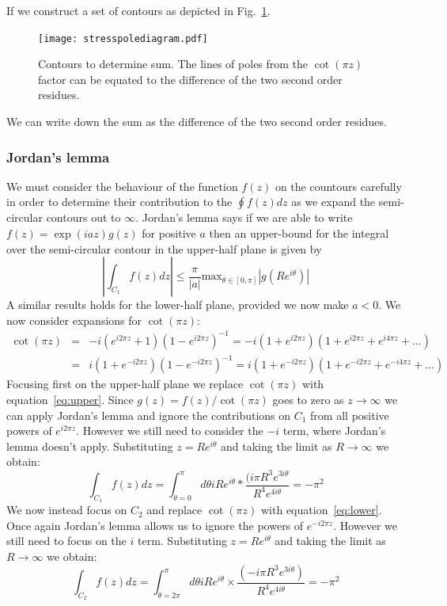 If we construct a set of contours as depicted in Fig.~\ref{fig:polediagram}.
\begin{figure}[!tbp]
\begin{center}
\texttt{[image: stresspolediagram.pdf]}
\caption{Contours to determine sum. The lines of poles from the $\cot(\pi z)$ 
factor can be equated to the difference of the two 
second order residues.\label{fig:polediagram}}
\end{center}
\end{figure}


We can write down the sum as the difference of the two second order residues.

\subsubsection{Jordan's lemma}
We must consider the behaviour of the function $f(z)$ on the countours carefully in order to determine their contribution to the $\oint f(z) dz$ as we expand the semi-circular contours out to $\infty$.  Jordan's lemma says if we are able to write $f(z) = \exp(iaz)g(z)$ for positive $a$ then an upper-bound for the integral over the semi-circular contour in the upper-half plane is given by
\begin{equation}
\left|\int_{C_{1}}f(z)dz\right| \leq \frac{\pi}{|a|}\text{max}_{\theta\in [0,\pi]}\left|g(Re^{i\theta})\right|
\end{equation}
A similar results holds for the lower-half plane, provided we now make $a<0$.  We now consider expansions for $\cot(\pi z)$:
\begin{eqnarray}
\cot(\pi z)&=&-i(e^{i2\pi z}+1)(1-e^{i2\pi z})^{-1}=-i(1+e^{i2\pi z})(1+e^{i2\pi z}+e^{i4\pi z}+\ldots)\label{eq:upper}\\
&=&i(1+e^{-i2\pi z})(1-e^{-i2\pi z})^{-1}=i(1+e^{-i2\pi z})(1+e^{-i2\pi z}+e^{-i4\pi z}+\ldots)\label{eq:lower}
\end{eqnarray}
Focusing first on the upper-half plane we replace $\cot(\pi z)$ with equation~\ref{eq:upper}.  Since $g(z)=f(z)/\cot(\pi z)$ goes to zero as $z\rightarrow\infty$ we can apply Jordan's lemma and ignore the contributions on $C_{1}$ from all positive powers of $e^{i2\pi z}$.  However we still need to consider the $-i$ term, where Jordan's lemma doesn't apply.  Substituting $z=Re^{i\theta}$ and taking the limit as $R\rightarrow\infty$ we obtain:
\begin{equation}
\int_{C_{1}}f(z)dz = \int_{\theta=0}^{\pi}d\theta iRe^{i\theta}*\frac{(i\pi R^{3}e^{3i\theta}}{R^{4}e^{4i\theta}} = -\pi^{2}
\end{equation}
We now instead focus on $C_{2}$ and replace $\cot(\pi z)$ with equation~\ref{eq:lower}.  Once again Jordan's lemma allows us to ignore the powers of $e^{-i2\pi z}$.  However we still need to focus on the $i$ term.  Substituting $z=Re^{i\theta}$ and taking the limit as $R\rightarrow\infty$ we obtain:
\begin{equation}
\int_{C_{2}}f(z)dz = \int_{\theta=2\pi}^{\pi}d\theta iRe^{i\theta}\times\frac{(-i\pi R^{3}e^{3i\theta})}{R^{4}e^{4i\theta}} = -\pi^{2}
\end{equation}

